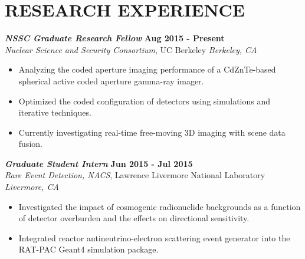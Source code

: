 \section{\small{RESEARCH EXPERIENCE}}

{\sl\bf NSSC Graduate Research Fellow} \hfill {\bf Aug 2015 - Present} \\
{\sl Nuclear Science and Security Consortium}, UC Berkeley \hfill {\sl Berkeley, CA} %
\vspace{2pt}
\begin{itemize}[leftmargin=4ex] \itemsep -2pt
\item Analyzing the coded aperture imaging performance of a CdZnTe-based spherical active coded aperture gamma-ray imager.
\item Optimized the coded configuration of detectors using simulations and iterative techniques.
\item Currently investigating real-time free-moving 3D imaging with scene data fusion.   
\end{itemize} 

{\sl\bf Graduate Student Intern} \hfill {\bf Jun 2015 - Jul 2015} \\
{\sl Rare Event Detection, NACS}, Lawrence Livermore National Laboratory \hfill {\sl Livermore, CA} %
\vspace{2pt}
\begin{itemize}[leftmargin=4ex] \itemsep -2pt
\item Investigated the impact of cosmogenic radionuclide backgrounds as a function of detector overburden and the effects on directional sensitivity.
\item Integrated reactor antineutrino-electron scattering event generator into the RAT-PAC Geant4 simulation package.
\end{itemize} 


